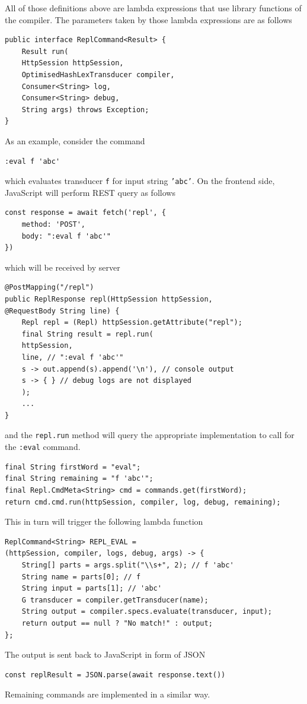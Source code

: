All of those definitions above are lambda expressions that use library functions
of the compiler. The parameters taken by those lambda expressions are as follows
\begin{lstlisting}
public interface ReplCommand<Result> {
    Result run(
    HttpSession httpSession, 
    OptimisedHashLexTransducer compiler, 
    Consumer<String> log, 
    Consumer<String> debug, 
    String args) throws Exception;
}
\end{lstlisting}
As an example, consider the command 
\begin{lstlisting}
:eval f 'abc'
\end{lstlisting}
which evaluates transducer   \texttt{f} for input string    \texttt{'abc'}. 
On the frontend side, JavaScript will perform REST query as follows
\begin{lstlisting}
const response = await fetch('repl', {
    method: 'POST',
    body: ":eval f 'abc'"
})
\end{lstlisting}
which will be received by server
\begin{lstlisting}
@PostMapping("/repl")
public ReplResponse repl(HttpSession httpSession, 
@RequestBody String line) {
    Repl repl = (Repl) httpSession.getAttribute("repl");
    final String result = repl.run(
    httpSession, 
    line, // ":eval f 'abc'"
    s -> out.append(s).append('\n'), // console output
    s -> { } // debug logs are not displayed
    );
    ...
}
\end{lstlisting}
and the     \texttt{repl.run} method will query the appropriate implementation to call for
the     \texttt{:eval} command.
\begin{lstlisting}     
final String firstWord = "eval";
final String remaining = "f 'abc'";
final Repl.CmdMeta<String> cmd = commands.get(firstWord);
return cmd.cmd.run(httpSession, compiler, log, debug, remaining);
\end{lstlisting}
This in turn will trigger the following lambda function
\begin{lstlisting}
ReplCommand<String> REPL_EVAL = 
(httpSession, compiler, logs, debug, args) -> {
    String[] parts = args.split("\\s+", 2); // f 'abc'
    String name = parts[0]; // f
    String input = parts[1]; // 'abc'
    G transducer = compiler.getTransducer(name);
    String output = compiler.specs.evaluate(transducer, input);
    return output == null ? "No match!" : output;
};
\end{lstlisting}
The output is sent back to JavaScript in form of JSON
\begin{lstlisting}
const replResult = JSON.parse(await response.text())
\end{lstlisting}
Remaining commands are implemented in a similar way.

